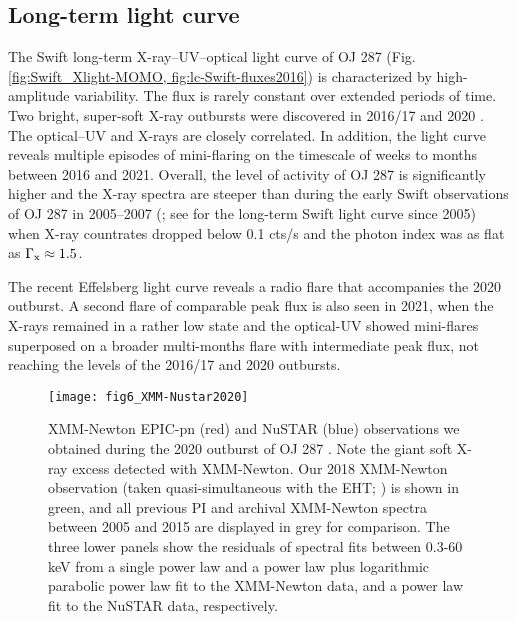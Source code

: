 \documentclass[preprints,article,accept,moreauthors,pdftex]{Definitions/mdpi}
\begin{document}
\subsection{Long-term light curve} 

The Swift long-term X-ray--UV--optical light curve of OJ 287 (Fig. \ref{fig:Swift_Xlight-MOMO, fig:lc-Swift-fluxes2016}) is characterized by high-amplitude variability. The flux is rarely constant over extended periods of time. Two bright, super-soft X-ray outbursts were discovered in 2016/17 \cite{Komossa2017} and 2020 \citep{Komossa2020}.  The optical--UV and X-rays are closely correlated.  In addition, the light curve reveals multiple episodes of mini-flaring on the timescale of weeks to months between 2016 and 2021. 
Overall, the level of activity of OJ 287 is significantly higher and the X-ray spectra are steeper than during the early Swift observations of OJ 287 in 2005--2007 (\citep{Massaro2008}; see \citep{Komossa2021a, Komossa2021c} for the long-term Swift light curve since 2005) when X-ray countrates dropped below 0.1 cts/s and the photon index was as flat as  $\Gamma_{\rm x} \approx 1.5$.  

The recent Effelsberg light curve 
reveals a radio flare that accompanies the 2020 outburst.  A second flare of comparable peak flux is also seen in 2021, when the X-rays remained in a rather low state and the optical-UV showed mini-flares superposed on a broader multi-months flare with intermediate peak flux, not reaching the levels of the 2016/17 and 2020 outbursts. 

\begin{figure}
\begin{center}
\texttt{[image: fig6\_XMM-Nustar2020]}
	\caption{XMM-Newton EPIC-pn (red) and NuSTAR (blue) observations we obtained during the 2020 outburst of OJ 287 \citep{Komossa2020}. Note the giant soft X-ray excess detected with XMM-Newton. Our 2018 XMM-Newton observation (taken quasi-simultaneous with the EHT; \citep{Komossa2021a}) is shown in green, and all previous PI and archival XMM-Newton spectra between 2005 and 2015 are displayed in grey for comparison. The three lower panels show the residuals of spectral fits between 0.3-60 keV from a  single power law and a power law plus logarithmic parabolic power law fit to the XMM-Newton data, and a power law fit to the NuSTAR data, respectively.
     }
     \label{fig:XMM-Nustar2020}
\end{center}
\end{figure}
\end{document}
